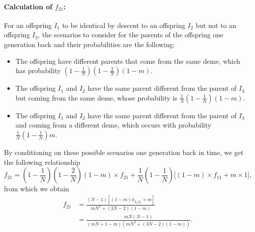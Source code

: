 \documentclass[11pt]{article}
\begin{document}
\paragraph{Calculation of $f_{21}$:}
For an offspring $I_1$ to be identical by descent to an offspring $I_2$ but not to an offspring $I_3$, the scenarios to consider for the parents of the offspring one generation back and their probabilities are the following: 
\begin{itemize}
\item The offspring have different parents that come from the same deme, which has probability $\left(1-\frac{1}{N}\right)\left(1-\frac{2}{N}\right)(1-m)$. 
\item The offspring $I_1$ and $I_2$ have the same parent different from the parent of $I_3$ but coming from the same deme,  whose  probability is $\frac{1}{N}\left(1-\frac{1}{N}\right)(1-m)$. 
\item The offspring $I_1$ and $I_2$ have the same parent different from the parent of $I_3$ and coming from a different deme, which occurs with probability $\frac{1}{N}\left(1-\frac{1}{N}\right)m$.
\end{itemize}
By conditioning on these possible scenarios one generation back in time, we get the following relationship
\begin{equation}
f_{21}=\left(1-\frac{1}{N}\right)\left(1-\frac{2}{N}\right)(1-m)\times f_{21}
+\frac{1}{N}\left(1-\frac{1}{N}\right)\Big[(1-m)\times f_{11}
+m\times1\Big],
\end{equation}
from which we obtain
\begin{align}
f_{21}&=\frac{(N-1)[(1-m)\phi_{I_1|I_3}+m]}{mN^2+(3N-2)(1-m)}\nonumber\\
&=\frac{mN(N-1)}{(mN+1-m)(mN^2+(3N-2)(1-m))}.
\end{align}



\end{document}
